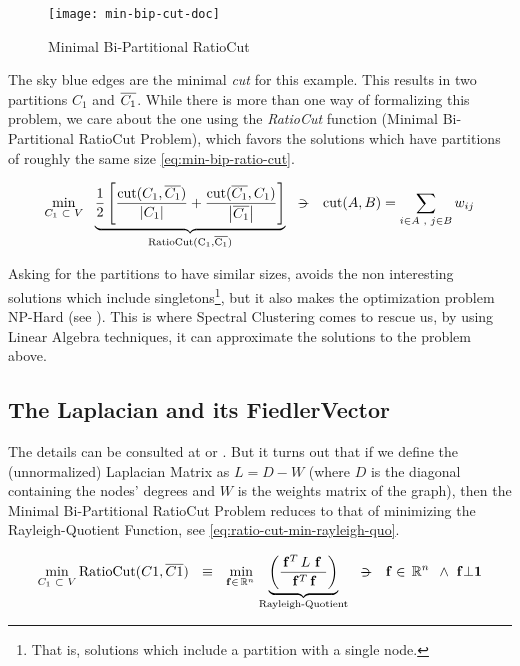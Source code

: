 \begin{figure}[H]
  \label{min-bip-cut}
  \centering
  \caption{Minimal Bi-Partitional RatioCut}  
  \texttt{[image: min-bip-cut-doc]}
\end{figure}

The sky blue edges are the minimal \emph{cut} for this example. This results
in two partitions $C_1$ and $\overline{C_1}$. While there is more than
one way of formalizing this problem, we care about the one
using the \emph{RatioCut} function (Minimal Bi-Partitional RatioCut Problem),
which favors the solutions which have partitions of roughly
the same size \cref{eq:min-bip-ratio-cut}.

\begin{equation}
  \label{eq:min-bip-ratio-cut}
  \min\limits_{\tiny{C_1 \ds{\subset} V}} \ds{}
  \underbrace{      
    \frac{1}{2}
    \left[
      \dfrac{\func{cut}(C_1,\stcomp{C_1})}{\abs{C_1}} +
      \dfrac{\func{cut}(\stcomp{C_1},C_1)}{\abs{\stcomp{C_1}}}
      \right]
  }_{\func{RatioCut(C_1,\stcomp{C_1})}}
  \ds{\suchthat}
  \func{cut}(A,B) = \sum\limits_{\tiny{i \in A \ds{,} j \in B}} w_{ij}
\end{equation}
\joinbelow{1cm}

Asking for the partitions to have similar sizes, avoids the non
interesting solutions which include singletons\footnote{That is,
  solutions which include a partition with a single node.}, but it also  
makes the optimization problem NP-Hard (see
\cite{wagner93}). This 
is where Spectral Clustering comes to rescue us, by using Linear
Algebra techniques, it can approximate the solutions to the problem
above.

\subsection{The \gls{Laplacian} and its \gls{FiedlerVector}}
The details can be consulted at \cite{luxburg07} or
\cite{gao13}. But it turns out that if we define the (unnormalized)
\gls{Laplacian} Matrix as $L = D - W$ (where $D$ is the diagonal containing
the nodes' degrees and $W$ is the weights matrix of the graph), then
the Minimal Bi-Partitional RatioCut Problem reduces to that of minimizing the
Rayleigh-Quotient Function, see \cref{eq:ratio-cut-min-rayleigh-quo}.

\begin{equation}
  \label{eq:ratio-cut-min-rayleigh-quo}
  \min\limits_{C_1 \ds{\subset} V} \func{RatioCut}(C1,\stcomp{C1})
  \ds{\ds{\equiv}}
  \min\limits_{\vec{f} \in \R{n}}
  \underbrace{
    \left(\dfrac{\trans{\vec{f}} L \ds{\vec{f}}}{\trans{\vec{f}} \vec{f}}\right)
  }_{\text{Rayleigh-Quotient}}    
  \ds{\suchthat}
  \vec{f} \in \R{n} \ds{\land} \vec{f} \bot \vec{1}
\end{equation}
\joinbelow{1cm}

